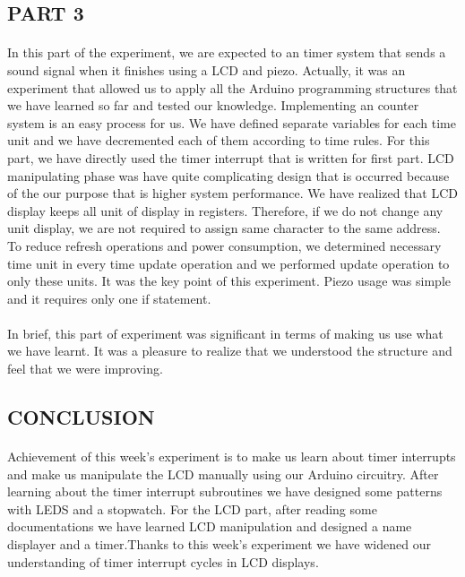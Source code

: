 \documentclass[pdftex,12pt,a4paper]{article}
\begin{document}
\begin{flushleft}
\subsection{PART 3}
\paragraph{}
In this part of the experiment, we are expected to an timer system that sends a sound signal when it finishes using a LCD and piezo. Actually, it was an experiment that allowed us to apply all the Arduino programming structures that we have learned so far and tested our knowledge. Implementing an counter system is an easy process for us. We have defined separate variables for each time unit and we have decremented each of them according to time rules. For this part, we have directly used the timer interrupt that is written for first part. LCD manipulating phase was have quite complicating design that is occurred because of the our purpose that is higher system performance. We have realized that LCD display keeps all unit of display in registers. Therefore, if we do not change any unit display, we are not required to assign same character to the same address. To reduce refresh operations and power consumption, we determined necessary time unit in every time update operation and we performed update operation to only these units. It was the key point of this experiment. Piezo usage was simple and it requires only one if statement.
\paragraph{}
In brief, this part of experiment was significant in terms of making us use what we have learnt. It was a pleasure to realize that we understood the structure and feel that we were improving.
\end{flushleft}



\begin{flushleft}
\section{CONCLUSION}
\paragraph{}
Achievement of this week's experiment is to make us learn about timer interrupts and make us manipulate the LCD manually using our Arduino circuitry. After learning about the timer interrupt subroutines we have designed some patterns with LEDS and a stopwatch. For the LCD part, after reading some documentations we have learned LCD manipulation and designed a name displayer and a timer.Thanks to this week's experiment we have widened our understanding of timer interrupt cycles in LCD displays.

\end{flushleft}
\newpage
\nocite{*}
\begin{flushleft}




\end{flushleft}
\end{document}
